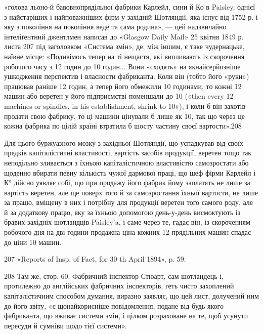 «голова льоно-й бавовнопрядільної фабрики Карлейл, сини й
Ко в Paisley, однієї з найстаріших і найповажніших фірм у західній
Шотляндії, яка існує від 1752 р. і яку з покоління на покоління
веде та сама родина», — цей надзвичайно інтеліґентний
джентлмен написав до «Glasgow Daily Mail» 25 квітня 1849 р.
листа 207 під заголовком «Система змін», де, між іншим, є таке
чудернацьке, наївне місце: «Подивімось тепер на ті нещастя,
які випливають із скорочення робочого часу з 12 годин до 10 годин...
Вони «сходять» на якнайсерйозніше ушкодження перспектив
і власности фабриканта. Коли він (тобто його «руки») працював
раніше 12 годин, а тепер його обмежили 10 годинами, то кожні
12 машин або веретен у його підприємстві поменшали до 10 («then
every 12 machines or spindles, in his establishment, shrink to 10»),
і коли б він захотів продати свою фабрику, то ці машини цінували
б лише як 10, так що через це кожна фабрика по цілій країні
втратила б шосту частину своєї вартости».208

Для цього буржуазного мозку з західньої Шотляндії, що
успадкував від своїх предків капіталістичні властивості, вартість
засобів продукції, веретен тощо так неподільно зливається з
їхньою капіталістичною властивістю самозростати або щоденно вбирати
певну кількість чужої дармової праці, що шеф фірми Карлейл
і К° дійсно уявляє собі, що при продажу його фабрик йому
заплатять не лише за вартість веретен, але ще поверх того й за
самозростання їхньої вартости, не лише за працю, вміщену в них
і потрібну для продукції веретен того самого роду, але й за додаткову
працю, яку за їхньою допомогою день-у-день висмоктують
із бравих західніх шотландців Paisley’a, і саме через те,
гадає він, із скороченням робочого дня на дві години продажна
ціна кожних 12 прядільних машин спадає до ціни 10 машин.

207 «Reports of Insp. of Fact, for 30 th April 1894», p. 59.

208 Там же, стор. 60. Фабричний інспектор Стюарт, сам шотландець і,
протилежно до англійських фабричних інспекторів, геть чисто захоплений
капіталістичним способом думання, виразно заявляє, що цей лист,
долучений ним до його звіту, «є щонайкорисніше повідомлення, подане від
будь-якого фабриканта, що вживає системи змін, і цілком розраховане
на те, щоб усунути пересуди й сумніви щодо тієї системи».
